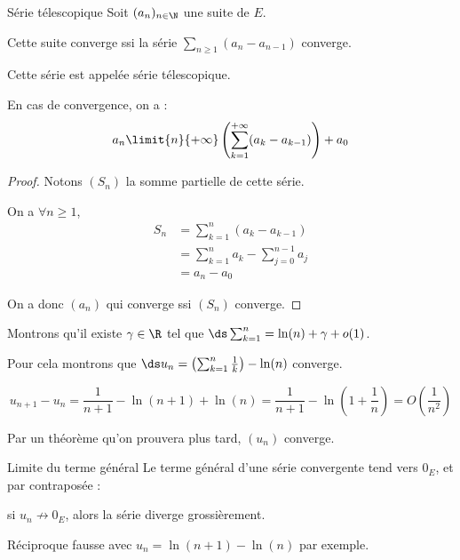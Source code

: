 \begin{theoreme}{Série télescopique}{}
    Soit $(a_n)_{n \in \N}$ une suite de $E$. 

    Cette suite converge ssi la série $\sum_{n \geqslant 1} (a_n - a_{n-1})$ converge.

    Cette série est appelée série télescopique. 

    En cas de convergence, on a : 
    \[a_n \limit{n}{+ \infty} \left( \sum_{k = 1 }^{+ \infty } (a_k - a_{k-1}) \right) + a_0\]
\end{theoreme}

\begin{proof}
    Notons $(S_n)$ la somme partielle de cette série. 

    On a $\forall n \geqslant 1$,
    \begin{align*}
        S_n & = \sum_{k=1}^n (a_k - a_{k-1}) \\
            & = \sum_{k=1}^n a_k - \sum_{j=0}^{n-1} a_j \\
            & = a_n - a_0
    \end{align*}

    On a donc $(a_n)$ qui converge ssi $(S_n)$ converge.
\end{proof}

\begin{exemple}
    Montrons qu'il existe $\gamma \in \R$ tel que $\ds \sum_{k=1}^n = \ln(n) + \gamma + o(1)$.
    
    Pour cela montrons que $\ds u_n = \left(\sum^n_{k=1} \frac 1 k\right) - \ln(n)$ converge.

    \[u_{n+1} - u_n = \frac 1 {n+1} - \ln(n+1) + \ln(n) = \frac 1 {n+1} - \ln\left(1 + \frac 1 n\right) = O\left(\frac 1 {n^2}\right)\]
    
    Par un théorème qu'on prouvera plus tard, $(u_n)$ converge.
\end{exemple}

\begin{theoreme}{Limite du terme général}{}
    Le terme général d'une série convergente tend vers $0_E$, et par contraposée :
    \begin{center}
    si $u_n \not \longrightarrow 0_E$, alors la série diverge grossièrement.
    \end{center}
\end{theoreme}

\begin{remarque}
    Réciproque fausse avec $u_n = \ln(n + 1) - \ln(n)$ par exemple. 
\end{remarque}

